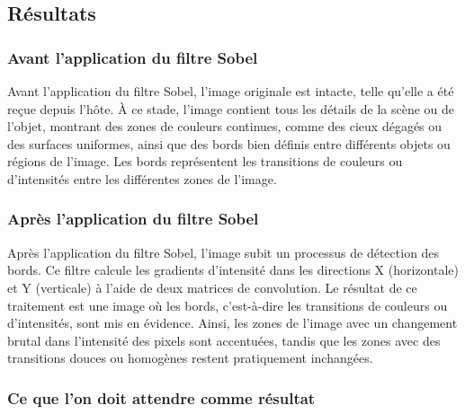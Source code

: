 \documentclass[../CSC_5RO07_TA.tex]{subfiles}
\begin{document}
\subsection{Résultats}

\subsubsection{Avant l'application du filtre Sobel}

Avant l'application du filtre Sobel, l'image originale est intacte, telle qu'elle a été reçue depuis l'hôte. À ce stade, l'image contient tous les détails de la scène ou de l'objet, montrant des zones de couleurs continues, comme des cieux dégagés ou des surfaces uniformes, ainsi que des bords bien définis entre différents objets ou régions de l'image. Les bords représentent les transitions de couleurs ou d'intensités entre les différentes zones de l'image.

\subsubsection{Après l'application du filtre Sobel}

Après l'application du filtre Sobel, l'image subit un processus de détection des bords. Ce filtre calcule les gradients d'intensité dans les directions X (horizontale) et Y (verticale) à l'aide de deux matrices de convolution. Le résultat de ce traitement est une image où les bords, c'est-à-dire les transitions de couleurs ou d'intensités, sont mis en évidence. Ainsi, les zones de l'image avec un changement brutal dans l'intensité des pixels sont accentuées, tandis que les zones avec des transitions douces ou homogènes restent pratiquement inchangées.

\subsubsection{Ce que l'on doit attendre comme résultat}
\end{document}
